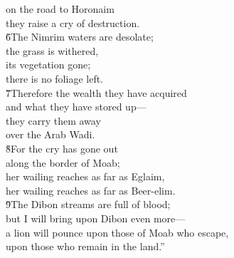 \begin{poetry}
\poeml on the road to Horonaim \\
\poemll    they raise a cry of destruction. \\
\poeml \v{6}The Nimrim waters are desolate; \\
\poemll    the grass is withered, \\
\poeml its vegetation gone; \\
\poemlll       there is no foliage left. \\
\poeml \v{7}Therefore the wealth they have acquired \\
\poemll    and what they have stored up--- \\
\poeml they carry them away \\
\poemll    over the Arab Wadi. \\
\poeml \v{8}For the cry has gone out \\
\poemll    along the border of Moab; \\
\poeml her wailing reaches as far as Eglaim, \\
\poemll    her wailing reaches as far as Beer-elim. \\
\poeml \v{9}The Dibon streams are full of blood; \\
\poemll    but I will bring upon Dibon even more--- \\
\poeml a lion will pounce upon those of Moab who escape, \\
\poeml upon those who remain in the land.''
\end{poetry}

